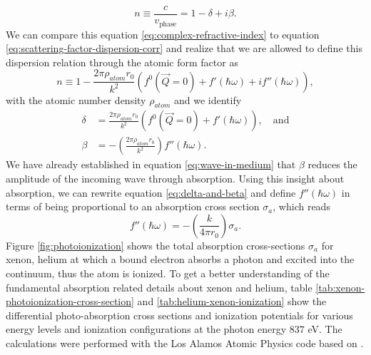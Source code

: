 \begin{equation}
n\equiv \frac{c}{v_{\text{phase}}}=1-\delta+i\beta.
\label{eq:complex-refractive-index}
\end{equation}
We can compare this equation \eqref{eq:complex-refractive-index} to equation \eqref{eq:scattering-factor-dispersion-corr} and realize that we are allowed to define this dispersion relation through the atomic form factor as \citep[see][p.~76]{Als-Nielson-2011-JWS}
\begin{equation}
n\equiv 1- \frac{2\pi \rho_{atom}r_{0}}{k^{2}}\left(f^{0}\left(\vec{Q}=0\right)+f'\left(\hbar\omega\right)+i f''\left(\hbar\omega\right)\right),
\label{eq:eq:complex-refractive-index-atomic-factors}
\end{equation}
with the atomic number density $\rho_{atom}$ and we identify
\begin{align}
\delta &= \frac{2 \pi \rho_{atom} r_{0}}{k^{2}}\left(f^{0}\left(\vec{Q}=0\right)+f'\left(\hbar\omega\right)\right),\quad \text{and}\\
\beta &= - \left(\frac{2\pi \rho_{atom}r_{0}}{k^{2}}\right)f''\left(\hbar\omega\right).
\label{eq:delta-and-beta}
\end{align}
We have already established in equation \eqref{eq:wave-in-medium} that $\beta$ reduces the amplitude of the incoming wave through absorption. Using this insight about absorption, we can rewrite equation \eqref{eq:delta-and-beta} and define $f''\left(\hbar\omega\right)$ in terms of being proportional to an absorption cross section $\sigma_{a}$, which reads
\begin{equation}
f''\left(\hbar\omega\right)=-\left(\frac{k}{4\pi r_{0}}\right)\sigma_{a}.
\label{eq:f-2-definition}
\end{equation}
Figure \ref{fig:photoionization} shows the total absorption cross-sections $\sigma_{a}$ for xenon, helium at which a bound electron absorbs a photon and excited into the continuum, thus the atom is ionized. To get a better understanding of the fundamental absorption related details about xenon and helium, table \ref{tab:xenon-photoionization-cross-section} and \ref{tab:helium-xenon-ionization} show the differential photo-absorption cross sections and ionization potentials for various energy levels and ionization configurations at the photon energy $837$ eV. The calculations were performed with the Los Alamos Atomic Physics code based on \citep{Cowan-1981-Cal}.
